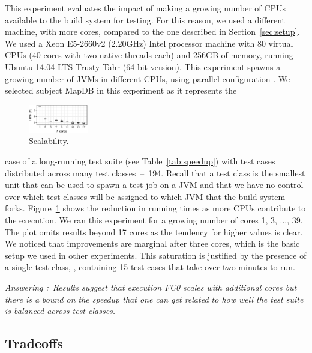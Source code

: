 \newcommand{\subjectScalability}{MapDB}

This experiment evaluates the impact of making a growing number of
CPUs available to the build system for testing.  For this reason, we
used a different machine, with more cores, compared to the one described in
Section~\ref{sec:setup}.  We used a Xeon E5-2660v2 (2.20GHz) Intel
processor machine with 80 virtual CPUs (40 cores with two native
threads each) and 256GB of memory, running Ubuntu 14.04 LTS Trusty
Tahr (64-bit version). This experiment
spawns a growing number of JVMs in different CPUs, using parallel
configuration \emph{\ForkSeq{}}. We selected
subject \subjectScalability{} in this experiment as it represents the
\begin{figure}
  \includegraphics[width=0.23\textwidth]{R/scalability/scalability.pdf}
  \caption{\label{fig:scalability}Scalability.}
  \vspace{-4mm}
\end{figure}
case of a long-running test suite (see Table~\ref{tab:speedup}) with
test cases distributed across many test classes~--~194.  
Recall that a test class is the smallest unit that can be used to spawn a test job
on a JVM and that we have no control over which test classes will be
assigned to which JVM that the build system forks.
Figure~\ref{fig:scalability} shows the reduction in running times as
more CPUs contribute to the execution.
We ran this experiment for a growing number of cores 1, 3, ..., 39. 
The plot omits results beyond 17 cores as the tendency for higher
values is clear.
We noticed that improvements are marginal after three cores, which is
the basic setup we used in other experiments.
This saturation is justified by the presence of a single test class,
, containing 15 test cases that take over
two minutes to run.

\begin{mdframed}
\noindent\textit{Answering \numRQSpeedupTwo{}:}~\emph{Results suggest that
  execution FC0 scales with additional cores but there is a bound
  on the speedup that one can get related to how well the test suite is
  balanced across test classes.}
\end{mdframed}

\subsection{Tradeoffs}
\label{sec:rq6-tradeoffs}

